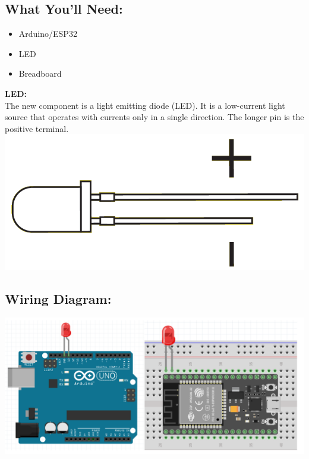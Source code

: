 \documentclass[a4paper,12pt]{report}
\newcommand{\diagramWidth}{150mm}
\begin{document}
    \subsection*{What You'll Need:}
        \begin{itemize}
            \item Arduino/ESP32
            \item LED
            \item Breadboard
        \end{itemize}
        \begin{mdframed}[linewidth = 3, linecolor = turbo_purple]
        \textbf{LED:}
        \\
        The new component is a light emitting diode (LED). It is a low-current light source that operates with currents only in a single direction. The longer pin is the positive terminal.
        \includegraphics[scale = 0.3]{Assets/led.png}
        \end{mdframed}
    \subsection*{Wiring Diagram:}
        \begin{center}
            \includegraphics[width = \diagramWidth]{Assets/LED_diagram.png}
        \end{center}
\end{document}
